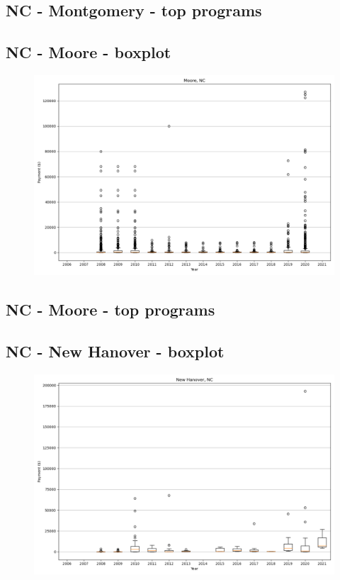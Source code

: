 \subsection*{NC - Montgomery - top programs}

\newpage
\subsection*{NC - Moore - boxplot}
\begin{figure}[h]
\centering
\includegraphics[width=7in]{../output/boxplots/counties/Moore-NC_boxplot.png}
\end{figure}


\subsection*{NC - Moore - top programs}

\newpage
\subsection*{NC - New Hanover - boxplot}
\begin{figure}[h]
\centering
\includegraphics[width=7in]{../output/boxplots/counties/New Hanover-NC_boxplot.png}
\end{figure}


